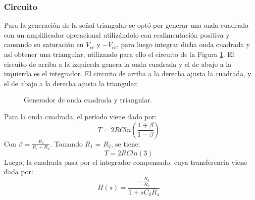 \documentclass[11pt, a4paper]{article}
\begin{document}
\subsubsection{Circuito}
%
Para la generaci\'on de la señal triangular se opt\'o por generar una onda cuadrada con un amplificador operacional utiliz\'andolo con realimentaci\'on positiva y causando su saturaci\'on en $V_{cc}$ y $-V_{cc}$, para luego integrar dicha onda cuadrada y as\'i obtener una triangular, utilizando para ello el circuito de la Figura \ref{fig:gen_triangular}. El circuito de arriba a la izquierda genera la onda cuadrada y el de abajo a la izquierda es el integrador. El circuito de arriba a la derecha ajusta la cuadrada, y el de abajo a la derecha ajusta la triangular.
%
\begin{figure}[H]
	\centering
	\caption{Generador de onda cuadrada y triangular.}
	\label{fig:gen_triangular}
\end{figure}
\noindent
Para la onda cuadrada, el per\'iodo viene dado por:
\begin{equation}
    T = 2 R C ln \left ( \frac{1 + \beta}{1 - \beta} \right )
\end{equation}
Con $\beta = \frac{R_2}{R_1 + R_2}$. Tomando $R_1$ = $R_2$, se tiene:
\begin{equation}
    T = 2 R C ln(3)
    \label{eq:clk2_freq}
\end{equation}
%
Luego, la cuadrada pasa por el integrador compensado, cuya transferencia viene dada por:
\begin{equation}
    H(s) = \frac{-\frac{R_4}{R_3}}{1 + s C_2 R_4}
\end{equation}
\end{document}
